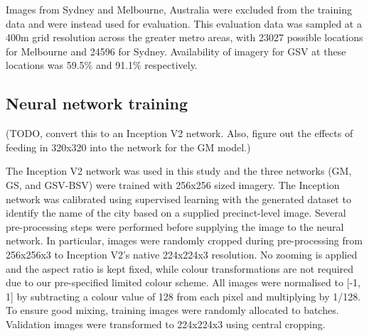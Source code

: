 \documentclass[10pt,letterpaper]{article}
\begin{document}


Images from Sydney and Melbourne, Australia were excluded from the training data and were instead used for evaluation. This evaluation data was sampled at a 400m grid resolution across the greater metro areas, with 23027 possible locations for Melbourne and 24596 for Sydney. Availability of imagery for GSV at these locations was 59.5\% and 91.1\% respectively. 


 \subsection*{Neural network training}\label{sec:methods4}    


(TODO, convert this to an Inception V2 network. Also, figure out the effects of feeding in 320x320 into the network for the GM model.)




The Inception V2 network was used in this study and the three networks (GM, GS, and GSV-BSV) were trained with 256x256 sized imagery. The Inception network was calibrated using supervised learning with the generated dataset to identify the name of the city based on a supplied precinct-level image. Several pre-processing steps were performed before supplying the image to the neural network. In particular, images were randomly cropped during pre-processing from 256x256x3 to Inception V2's native 224x224x3 resolution. No zooming is applied and the aspect ratio is kept fixed, while colour transformations are not required due to our pre-specified limited colour scheme. All images were normalised to [-1, 1] by subtracting a colour value of 128 from each pixel and multiplying by 1/128. To ensure good mixing, training images were randomly allocated to batches. Validation images were transformed to 224x224x3 using central cropping.
\end{document}
